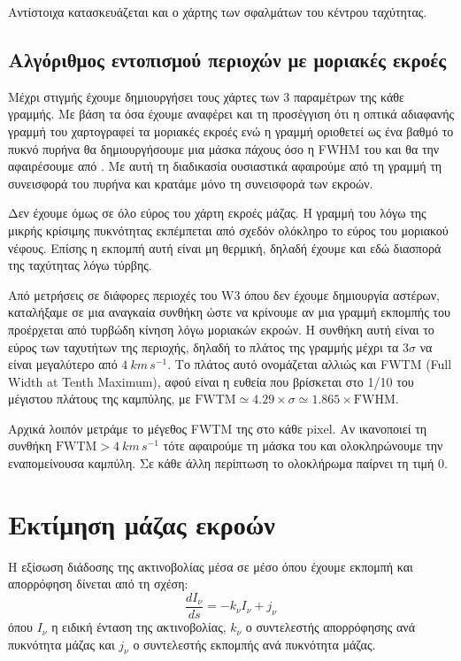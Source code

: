 \documentclass[a4paper,12pt]{memoir}
\begin{document}
Αντίστοιχα κατασκευάζεται και ο χάρτης των σφαλμάτων του κέντρου ταχύτητας.



\subsection{Αλγόριθμος εντοπισμού περιοχών με μοριακές εκροές}
\label{par:outflow_detect}
Μέχρι στιγμής έχουμε δημιουργήσει τους χάρτες των 3 παραμέτρων της κάθε γραμμής. Με βάση τα όσα έχουμε αναφέρει και τη προσέγγιση ότι η οπτικά αδιαφανής γραμμή του  χαρτογραφεί τα μοριακές εκροές ενώ η γραμμή  οριοθετεί ως ένα βαθμό το πυκνό πυρήνα θα δημιουργήσουμε μια μάσκα πάχους όσο η FWHM του  και θα την αφαιρέσουμε από . Με αυτή τη διαδικασία ουσιαστικά αφαιρούμε από τη γραμμή  τη συνεισφορά του πυρήνα και κρατάμε μόνο τη συνεισφορά των εκροών.

Δεν έχουμε όμως σε όλο εύρος του χάρτη εκροές μάζας. Η γραμμή του  λόγω της μικρής κρίσιμης πυκνότητας εκπέμπεται από σχεδόν ολόκληρο το εύρος του μοριακού νέφους. Επίσης η εκπομπή αυτή είναι μη θερμική, δηλαδή έχουμε και εδώ διασπορά της ταχύτητας λόγω τύρβης.

Από μετρήσεις σε διάφορες περιοχές του W3 όπου δεν έχουμε δημιουργία αστέρων, καταλήξαμε σε μια αναγκαία συνθήκη ώστε να κρίνουμε αν μια γραμμή εκπομπής του  προέρχεται από τυρβώδη κίνηση λόγω μοριακών εκροών. Η συνθήκη αυτή είναι το εύρος των ταχυτήτων της περιοχής, δηλαδή το πλάτος της γραμμής μέχρι τα $3\sigma$ να είναι μεγαλύτερο από $4\ km\, s^{-1}$. Το πλάτος αυτό ονομάζεται αλλιώς και FWTM (Full Width at Tenth Maximum), αφού είναι η ευθεία που βρίσκεται στο 1/10 του μέγιστου πλάτους της καμπύλης, με $\text{FWTM}\simeq 4.29\times \sigma \simeq 1.865 \times \text{FWHM}$. 

Αρχικά λοιπόν μετράμε το μέγεθος FWTM της  στο κάθε pixel. Αν ικανοποιεί τη συνθήκη $\text{FWTM} > 4\ km\, s^{-1}$ τότε αφαιρούμε τη μάσκα του  και ολοκληρώνουμε την εναπομείνουσα καμπύλη. Σε κάθε άλλη περίπτωση το ολοκλήρωμα παίρνει τη τιμή 0.


\section{Εκτίμηση μάζας εκροών}
Η εξίσωση διάδοσης της ακτινοβολίας μέσα σε μέσο όπου έχουμε εκπομπή και απορρόφηση δίνεται από τη σχέση:
\begin{equation}
\frac{dI_{\nu}}{ds}=-k_{\nu} I_{\nu} +j_{\nu}
\end{equation}
όπου $Ι_{\nu}$ η ειδική ένταση της ακτινοβολίας, $k_{\nu}$ ο συντελεστής απορρόφησης ανά πυκνότητα μάζας και $j_{\nu}$ ο συντελεστής εκπομπής ανά πυκνότητα μάζας.
\end{document}
